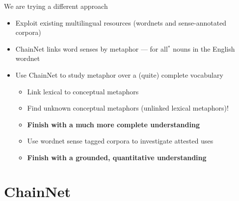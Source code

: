 \documentclass[xetex]{beamer}
\begin{document}
\begin{frame}{We are trying a different approach}
  \begin{itemize}
  \item Exploit existing multilingual resources (wordnets and sense-annotated corpora)
  \item ChainNet links word senses by metaphor --- for all$^*$ nouns in the English wordnet
  \item Use ChainNet to study metaphor over a (quite) complete vocabulary
    \begin{itemize}
    \item Link lexical to conceptual metaphors
    \item Find unknown conceptual metaphors (unlinked lexical metaphors)!
    \item \textbf{Finish with a much more complete understanding}
    \item Use wordnet sense tagged corpora to investigate attested uses
    \item \textbf{Finish with a grounded, quantitative understanding}
    \end{itemize}
  \end{itemize}
\end{frame}




\section{ChainNet}
\label{sec:chainnet}
\end{document}
